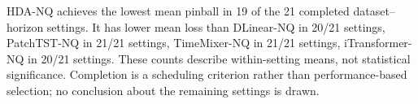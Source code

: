 HDA-NQ achieves the lowest mean pinball in 19 of the 21 completed dataset--horizon settings. It has lower mean loss than DLinear-NQ in 20/21 settings, PatchTST-NQ in 21/21 settings, TimeMixer-NQ in 21/21 settings, iTransformer-NQ in 20/21 settings. These counts describe within-setting means, not statistical significance. Completion is a scheduling criterion rather than performance-based selection; no conclusion about the remaining settings is drawn.
